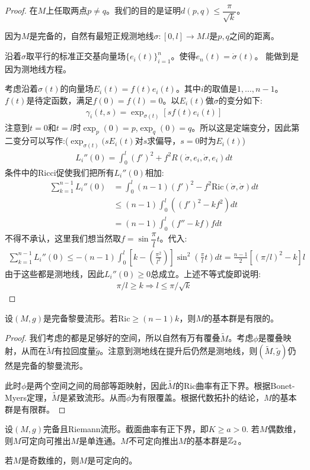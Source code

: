 \begin{proof}
    在$M$上任取两点$p\neq q$。我们的目的是证明$d(p,q)\leq \dfrac{\pi}{\sqrt{k}}$。

    因为$M$是完备的，自然有最短正规测地线$\sigma:[0,l] \to M$.$l$是$p,q$之间的距离。

    沿着$\sigma$取平行的标准正交基向量场$\{e_i(t)\}_{i=1}^n$。使得$e_n(t)=\dot{\sigma}(t)$。 能做到是因为测地线方程。

    考虑沿着$\sigma(t)$的向量场$E_i(t)=f(t)e_i(t)$。其中$i$的取值是$1,\dots,n-1$。$f(t)$是待定函数，满足$f(0)=f(l)=0$。以$E_i(t)$做$\sigma$的变分如下:
    \begin{align*}
        \gamma_i(t,s)=\exp_{\sigma(t)}[sf(t)e_i(t)]
    \end{align*}
注意到$t=0$和$t=l$时$\exp_p(0)=p$,$\exp_q(0)=q$。所以这是定端变分，因此第二变分可以写作:($\exp_{\sigma(t)}(sE_i(t)$对$s$求偏导，$s=0$时为$E_i(t)$)
\begin{align*}
L_i''(0)=\int_0^l(f')^2+f^2R(\dot{\sigma},e_i,\dot{\sigma},e_i)dt
\end{align*}
条件中的Ricci促使我们把所有$L_i''(0)$相加:
\begin{align*}
    \sum_{k=1}^{n-1}L_i''(0)&=\int_0^l (n-1)(f')^2-f^2\mathrm{Ric}(\dot{\sigma},\dot{\sigma})dt\\&\leq (n-1)\int_0^l((f')^2-kf^2)dt\\&=(n-1)\int_0^l(f''-kf)fdt
\end{align*}
不得不承认，这里我们想当然取$f=\sin \dfrac{\pi}{l}t$。代入:
\begin{align*}
    \sum_{k=1}^{n-1}L_i''(0)\leq -(n-1)\int_0^l[k-(\frac{\pi^2}{l^2})]\sin^2(\frac{\pi }{l}t)dt=\frac{n-1}{2}[(\pi/l)^2-k]l
\end{align*}
由于这些都是测地线，因此$L_i''(0)\geq 0$总成立。上述不等式旋即说明:
\begin{align*}
    \pi/l \geq k \Rightarrow l \leq \pi/\sqrt{k}
\end{align*}
\end{proof}


\begin{corollary}
    设$(M,g)$是完备黎曼流形。若$\mathrm{Ric}\geq (n-1)k$，则$M$的基本群是有限的。
\end{corollary}
\begin{proof}
    我们考虑的都是足够好的空间，所以自然有万有覆叠$\tilde{M}$。考虑$\phi$是覆叠映射，从而在$\tilde{M}$有拉回度量$\tilde{g}$。注意到测地线在提升后仍然是测地线，则$(\tilde{M},\tilde{g})$仍然是完备的黎曼流形。

    此时$\phi$是两个空间之间的局部等距映射，因此$\tilde{M}$的Ric曲率有正下界。根据Bonet-Myers定理，$\tilde{M}$是紧致流形。从而$\phi$为有限覆盖。根据代数拓扑的结论，$M$的基本群是有限群。
\end{proof}
\begin{theorem}[Synge]
    设$(M,g)$完备且Riemann流形。截面曲率有正下界，即$K \geq a>0$.
    若$M$偶数维，则$M$可定向可推出$M$是单连通。$M$不可定向推出$M$的基本群是$\mathbb{Z}_2$。

    若$M$是奇数维的，则$M$是可定向的。
\end{theorem}

